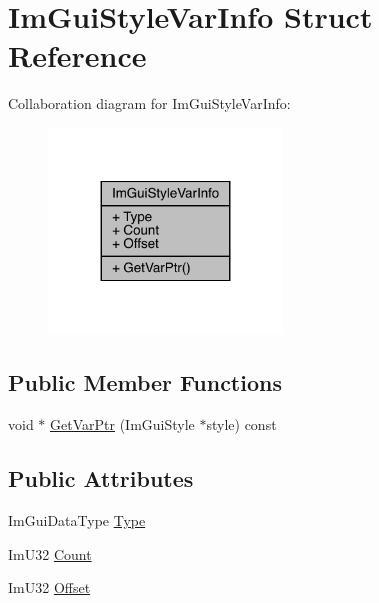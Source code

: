 \hypertarget{struct_im_gui_style_var_info}{}\section{Im\+Gui\+Style\+Var\+Info Struct Reference}
\label{struct_im_gui_style_var_info}


Collaboration diagram for Im\+Gui\+Style\+Var\+Info\+:
\nopagebreak
\begin{figure}[H]
\begin{center}
\leavevmode
\includegraphics[width=176pt]{d0/d51/struct_im_gui_style_var_info__coll__graph}
\end{center}
\end{figure}
\subsection*{Public Member Functions}
\begin{DoxyCompactItemize}
\item 
void $\ast$ \mbox{\hyperlink{struct_im_gui_style_var_info_a92aebc5f0d8b2b43b61dbcaf992b5643}{Get\+Var\+Ptr}} (Im\+Gui\+Style $\ast$style) const
\end{DoxyCompactItemize}
\subsection*{Public Attributes}
\begin{DoxyCompactItemize}
\item 
Im\+Gui\+Data\+Type \mbox{\hyperlink{struct_im_gui_style_var_info_a62f42d2bb7b71b7530493e16e622cb81}{Type}}
\item 
Im\+U32 \mbox{\hyperlink{struct_im_gui_style_var_info_acfab57d23ba575db3595da80989b444e}{Count}}
\item 
Im\+U32 \mbox{\hyperlink{struct_im_gui_style_var_info_ae900d6a02166d3d0433c18b95aec10e8}{Offset}}
\end{DoxyCompactItemize}


